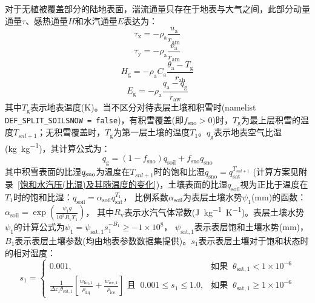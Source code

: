 对于无植被覆盖部分的陆地表面，湍流通量只存在于地表与大气之间，此部分动量通量$\tau$、感热通量$H$和水汽通量$E$表达为：
\begin{equation}\label{tau_x}
  \tau_{\mathrm{x}}=-\rho_{\mathrm{a}} \frac{u_{\mathrm{a}}}{r_{\mathrm{a m}}}
\end{equation}
\begin{equation}\label{tau_y}
  \tau_{\mathrm{y}}=-\rho_{\mathrm{a}} \frac{v_{\mathrm{a}}}{r_{\mathrm{a m}}}
\end{equation}
\begin{equation}\label{Hg}
  H_{\mathrm{g}}=-\rho_{\mathrm{a}} C_{\mathrm{a}} \frac{\theta_{\mathrm{a}}-T_{\mathrm{g}}}{r_{\mathrm{a h}}}
\end{equation}
\begin{equation}\label{Eg}
  E_{\mathrm{g}}=-\rho_{\mathrm{a}} \frac{q_{\mathrm{a}}-q_{\mathrm{g}}}{r_{\mathrm{a w}}}
\end{equation}
其中$T_{\mathrm {g}}$表示地表温度(K)。当不区分对待表层土壤和积雪时(namelist \allowbreak \texttt{DEF\_SPLIT\_\allowbreak SOILSNOW \allowbreak = \allowbreak false})，有积雪覆盖(即$f_{\mathrm{sno}}>0$)时，$T_{\mathrm {g}}$为最上层积雪的温度$T_{snl+1}$；无积雪覆盖时，$T_{\mathrm {g}}$为第一层土壤的温度$T_1$。$q_{\mathrm {g}}$表示地表空气比湿(\unit{kg.kg^{-1}})，其计算公式为：
\begin{equation}\label{qg}
  q_{\mathrm{g}}=\left(1-f_{\mathrm{{sno }}}\right) q_{\mathrm{{soil }}}+f_{\mathrm{{sno }}} q_{\mathrm{{sno }}}
\end{equation}
其中积雪表面的比湿$q_{\rm sno}$为温度在$T_{snl+1}$时的饱和比湿$q_{\mathrm{sno}}=q_{\mathrm{sat}}^{T_{snl+1}}$
(计算方案见附录~\ref{饱和水汽压(比湿)及其随温度的变化})，土壤表面的比湿$q_{\mathrm{soil}}$视为正比于温度在$T_1$时的饱和比湿：$q_{\mathrm{soil}}=\alpha_{\mathrm{soil}}q_{\mathrm{sat}}^{T_1}$，
比例系数$\alpha_{\mathrm{soil}}$为表层土壤水势$\psi_1$(mm)的函数\citep{philip1957theory}：$\alpha_{\mathrm{soil}}=\exp \left(\frac{\psi_1g}{{10}^3R_{\mathrm{v}}T_1}\right)$，
其中$R_{\mathrm{v}}$表示水汽气体常数(\unit{J.kg^{-1}.K^{-1}})。表层土壤水势$\psi_1$的计算公式为$\psi_1=\psi_{\mathrm{sat,1}}s_1^{-B_1}\geqslant-1\times{10}^8$，
$\psi_{\mathrm{sat,1}}$表示表层饱和土壤水势(mm)，$B_1$表示表层土壤\citep{clapp1978empirical}参数(均由地表参数数据集提供)。$s_1$表示表层土壤对于饱和状态时的相对湿度：
\begin{equation}
  s_{1}= \begin{cases}
    0.001, & \text {如果 }\ \theta_{\mathrm{sat, 1}}<1 \times 10^{-6} \\
    \frac{1}{\Delta z_{1} \theta_{\mathrm{sat, 1}}}\left[\frac{w_{\mathrm{liq, 1}}}{\rho_{\mathrm{liq}}}+\frac{w_{\mathrm{ice, 1}}}{\rho_{\mathrm{ice}}}\right]  \text{ 且  }\  0.001 \leqslant s_{1} \leqslant 1.0, & \text {如果 }\ \theta_{\mathrm{sat, 1}} \geqslant 1 \times 10^{-6}
  \end{cases}
\end{equation}
